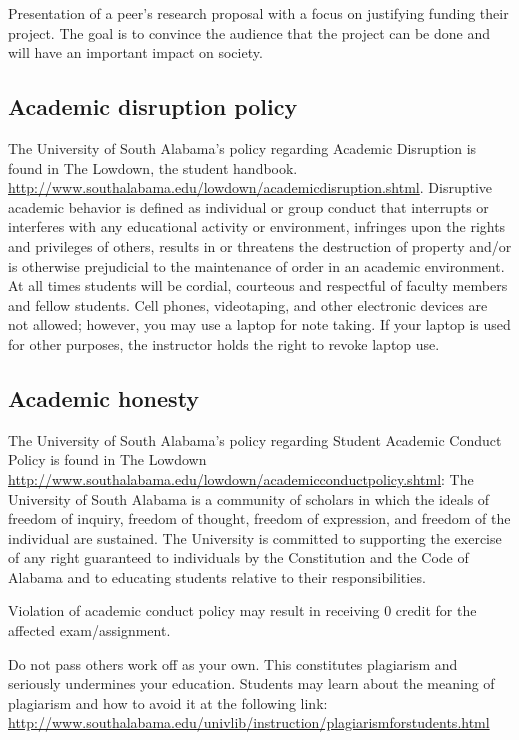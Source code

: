 \documentclass[11pt,]{article}
\begin{document}
Presentation of a peer's research proposal with a focus on justifying
funding their project. The goal is to convince the audience that the
project can be done and will have an important impact on society.

\newpage

\hypertarget{academic-disruption-policy}{%
\subsection{Academic disruption
policy}\label{academic-disruption-policy}}

The University of South Alabama's policy regarding Academic Disruption
is found in The Lowdown, the student handbook.
\url{http://www.southalabama.edu/lowdown/academicdisruption.shtml}.
Disruptive academic behavior is defined as individual or group conduct
that interrupts or interferes with any educational activity or
environment, infringes upon the rights and privileges of others, results
in or threatens the destruction of property and/or is otherwise
prejudicial to the maintenance of order in an academic environment. At
all times students will be cordial, courteous and respectful of faculty
members and fellow students. Cell phones, videotaping, and other
electronic devices are not allowed; however, you may use a laptop for
note taking. If your laptop is used for other purposes, the instructor
holds the right to revoke laptop use.

\hypertarget{academic-honesty}{%
\subsection{Academic honesty}\label{academic-honesty}}

The University of South Alabama's policy regarding Student Academic
Conduct Policy is found in The Lowdown
\url{http://www.southalabama.edu/lowdown/academicconductpolicy.shtml}:
The University of South Alabama is a community of scholars in which the
ideals of freedom of inquiry, freedom of thought, freedom of expression,
and freedom of the individual are sustained. The University is committed
to supporting the exercise of any right guaranteed to individuals by the
Constitution and the Code of Alabama and to educating students relative
to their responsibilities.

Violation of academic conduct policy may result in receiving 0 credit
for the affected exam/assignment.

Do not pass others work off as your own. This constitutes plagiarism and
seriously undermines your education. Students may learn about the
meaning of plagiarism and how to avoid it at the following link:
\url{http://www.southalabama.edu/univlib/instruction/plagiarismforstudents.html}
\end{document}
